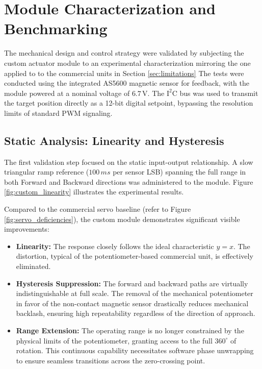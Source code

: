 \section{Module Characterization and Benchmarking}

The mechanical design and control strategy were validated by subjecting the custom actuator module to an
experimental characterization mirroring the one applied to to the commercial units in Section
\ref{sec:limitations} The tests were conducted using the integrated AS5600 magnetic sensor for feedback,
with the module powered at a nominal voltage of $6.7\,\text{V}$. The $\text{I}^2\text{C}$ bus was used to
transmit the target position directly as a 12-bit digital setpoint, bypassing the resolution limits of
standard PWM signaling.


\subsection{Static Analysis: Linearity and Hysteresis}

The first validation step focused on the static input-output relationship. A slow triangular ramp reference
($100\,ms$ per sensor LSB) spanning the full range in both Forward and Backward directions was administered
to the module. Figure \ref{fig:custom_linearity} illustrates the experimental results.

Compared to the commercial servo baseline (refer to Figure \ref{fig:servo_deficiencies}), the custom module
demonstrates significant visible improvements:

\begin{itemize}
    \item \textbf{Linearity:} The response closely follows the ideal characteristic $y=x$. The distortion,
        typical of the potentiometer-based commercial unit, is effectively eliminated.
    \item \textbf{Hysteresis Suppression:} The forward and backward paths are virtually indistinguishable at
        full scale. The removal of the mechanical potentiometer in favor of the non-contact magnetic sensor
        drastically reduces mechanical backlash, ensuring high repeatability regardless of the direction of
        approach.
    \item \textbf{Range Extension:} The operating range is no longer constrained by the physical limits of
        the potentiometer, granting access to the full $360^\circ$ of rotation. This continuous capability
        necessitates software phase unwrapping to ensure seamless transitions across the zero-crossing point.
\end{itemize}

